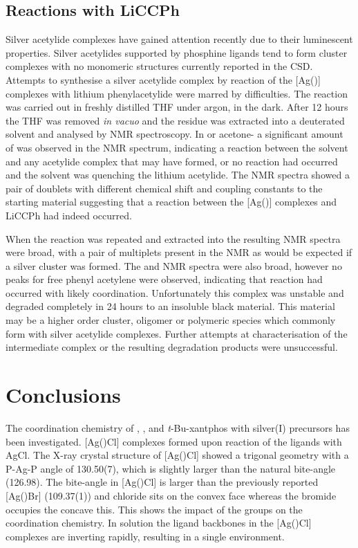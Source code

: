 \subsection{Reactions with LiCCPh}

Silver acetylide complexes have gained attention recently due to their luminescent properties.\cite{Yam1997, Yam1998, Xu2013}  Silver acetylides supported by phosphine ligands tend to form cluster complexes with no monomeric structures currently reported in the \gls{CSD}.\cite{Allen2002}  Attempts to synthesise a silver acetylide complex by reaction of the [Ag(\tBuxantphos)] complexes with lithium phenylacetylide were marred by difficulties.  The reaction was carried out in freshly distilled THF under argon, in the dark.  After 12 hours the THF was removed \emph{in vacuo} and the residue was extracted into a deuterated solvent and analysed by NMR spectroscopy.  In  or acetone- a significant amount of  was observed in the \carbon{} NMR spectrum, indicating a reaction between the solvent and any acetylide complex that may have formed, or no reaction had occurred and the solvent was quenching the lithium acetylide.  The \phosphorus{} NMR spectra showed a pair of doublets with different chemical shift and coupling constants to the starting material suggesting that a reaction between the [Ag(\tBuxantphos)] complexes and LiCCPh had indeed occurred. 

When the reaction was repeated and extracted into  the resulting NMR spectra were broad, with a pair of multiplets present in the \phosphorus{} NMR as would be expected if a silver cluster was formed.  The \proton{} and \carbon{} NMR spectra were also broad, however no peaks for free phenyl acetylene were observed, indicating that reaction had occurred with likely coordination.  Unfortunately this complex was unstable and degraded completely in 24 hours to an insoluble black material.  This material may be a higher order cluster, oligomer or polymeric species which commonly form with silver acetylide complexes.  Further attempts at characterisation of the intermediate complex or the resulting degradation products were unsuccessful.

\section{Conclusions}

The coordination chemistry of \tBusixantphos{}, \tButhixantphos{}, and \emph{t}-Bu-xant\-phos with silver(I) precursors has been investigated.  [Ag(\tBuxantphos)Cl] complexes formed upon reaction of the ligands with AgCl.  The X-ray crystal structure of [Ag(\tButhixantphos)Cl] showed a trigonal geometry with a P-Ag-P angle of 130.50(7)\degrees{}, which is slightly larger than the natural bite-angle (126.98\degrees).  The bite-angle in [Ag(\tButhixantphos)Cl] is larger than the previously reported [Ag(\Phxantphos)Br] (109.37(1)\degrees) and chloride sits on the convex face whereas the bromide occupies the concave this.  This shows the impact of the \tBu{} groups on the coordination chemistry.  In solution the ligand backbones in the [Ag(\tBuxantphos)Cl] complexes are inverting rapidly, resulting in a single \tBu{} environment.  

